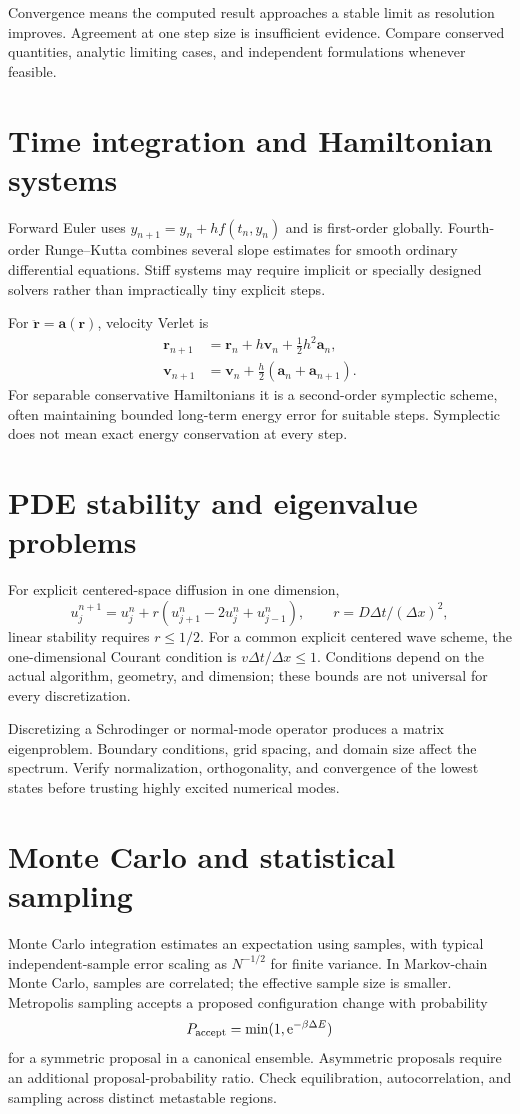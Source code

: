 \documentclass[11pt,oneside]{book}
\newcommand{\ee}{\mathrm{e}}
\newcommand{\vect}[1]{\boldsymbol{#1}}
\theoremstyle{reviewstyle}
\begin{document}
Convergence means the computed result approaches a stable limit as resolution improves. Agreement at one step size is insufficient evidence. Compare conserved quantities, analytic limiting cases, and independent formulations whenever feasible.
\section{Time integration and Hamiltonian systems}
Forward Euler uses $y_{n+1}=y_n+h f(t_n,y_n)$ and is first-order globally. Fourth-order Runge--Kutta combines several slope estimates for smooth ordinary differential equations. Stiff systems may require implicit or specially designed solvers rather than impractically tiny explicit steps.

For $\ddot{\vect r}=\vect a(\vect r)$, velocity Verlet is
\begin{align}
\vect r_{n+1}&=\vect r_n+h\vect v_n+\tfrac12h^2\vect a_n,\\
\vect v_{n+1}&=\vect v_n+\tfrac h2(\vect a_n+\vect a_{n+1}).
\end{align}
For separable conservative Hamiltonians it is a second-order symplectic scheme, often maintaining bounded long-term energy error for suitable steps. Symplectic does not mean exact energy conservation at every step.
\section{PDE stability and eigenvalue problems}
For explicit centered-space diffusion in one dimension,
\begin{equation}u_j^{n+1}=u_j^n+r(u_{j+1}^n-2u_j^n+u_{j-1}^n),\qquad r=D\Delta t/(\Delta x)^2,\end{equation}
linear stability requires $r\leq1/2$. For a common explicit centered wave scheme, the one-dimensional Courant condition is $v\Delta t/\Delta x\leq1$. Conditions depend on the actual algorithm, geometry, and dimension; these bounds are not universal for every discretization.

Discretizing a Schrodinger or normal-mode operator produces a matrix eigenproblem. Boundary conditions, grid spacing, and domain size affect the spectrum. Verify normalization, orthogonality, and convergence of the lowest states before trusting highly excited numerical modes.
\section{Monte Carlo and statistical sampling}
Monte Carlo integration estimates an expectation using samples, with typical independent-sample error scaling as $N^{-1/2}$ for finite variance. In Markov-chain Monte Carlo, samples are correlated; the effective sample size is smaller. Metropolis sampling accepts a proposed configuration change with probability
\begin{equation}P_{\rm accept}=\min(1,\ee^{-\beta\Delta E})\end{equation}
for a symmetric proposal in a canonical ensemble. Asymmetric proposals require an additional proposal-probability ratio. Check equilibration, autocorrelation, and sampling across distinct metastable regions.
\end{document}
